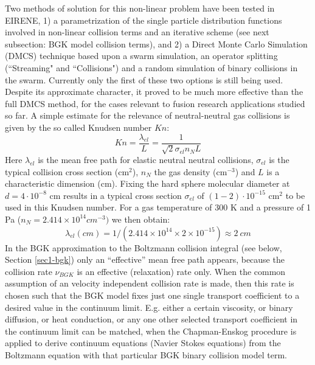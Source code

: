Two methods of solution for this non-linear problem have been
tested in EIRENE, 1) a parametrization of the single particle
distribution functions involved in non-linear collision terms and
an iterative scheme (see next subsection: BGK model collision
terms), and 2) a Direct Monte Carlo Simulation (DMCS) technique
based upon a swarm simulation, an operator splitting (``Streaming"
and ``Collisions") and a random simulation of binary collisions in
the swarm. Currently only the first of these two options is still
being used. Despite its approximate character, it proved
to be much more effective than the full DMCS method, for the cases
relevant to fusion research applications studied so far. A simple
estimate for the relevance of neutral-neutral gas collisions is
given by the so called Knudsen number $Kn$:
\begin{equation}
Kn = \frac{\lambda_{el}}{L} = \frac{1}{\sqrt{2} \sigma_{el} n_N L}
\end{equation}
Here $\lambda_{el}$ is the mean free path for elastic neutral
neutral collisions, $\sigma_{el}$ is the typical collision cross section (cm$^{2}$),
$n_N$ the gas density (cm$^{-3}$) and $L$ is a characteristic dimension
(cm). Fixing the hard sphere molecular diameter at $d=4 \cdot
10^{-8}$ cm results in a typical cross section $\sigma_{el}$ of $(1-2) \cdot
10^{-15}$ cm$^2$ to be used in this Knudsen number.  For a gas temperature  of
300 K and a pressure of 1 Pa ($n_N=2.414 \times 10^{14} cm^{-3} )$ we then obtain:
\begin{equation}
\lambda_{el} (cm) = 1/(2.414\times 10^{14}\times 2\times 10^{-15}) \approx 2 ~cm
\end{equation}
In the BGK approximation to the Boltzmann collision integral (see below, Section \ref{sec1-bgk}) only an ``effective'' mean free path
appears, because the collision rate $\nu_{BGK}$ is an effective (relaxation) rate only. When the common assumption of an velocity independent
collision rate is made, then this rate is
chosen such that the BGK model fixes just
one single transport coefficient to a desired value in the continuum limit. E.g. either a certain viscosity, or  binary diffusion, or heat conduction, or any one
other selected transport coefficient in the continuum limit can be matched, when the Chapman-Enskog procedure is applied to derive continuum
equations (Navier Stokes equations) from the Boltzmann equation with that particular BGK binary collision model term.

